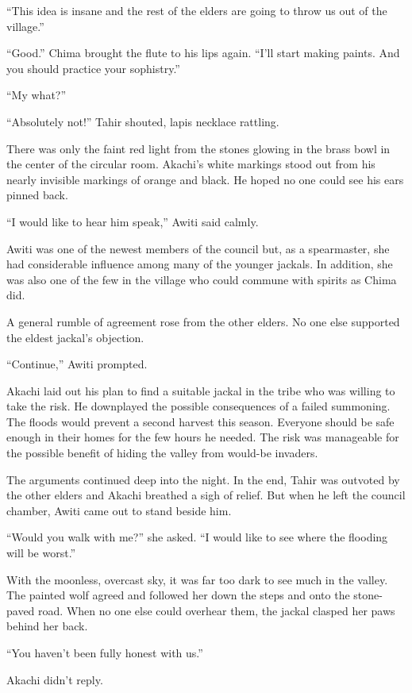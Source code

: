``This idea is insane and the rest of the elders are going to throw us out of the village.''

``Good.'' Chima brought the flute to his lips again. ``I'll start making paints. And you should practice your sophistry.''

``My what?''

\secdiv

\noindent ``Absolutely not!'' Tahir shouted, lapis necklace rattling.

There was only the faint red light from the stones glowing in the brass bowl in the center of the circular room. Akachi's white markings stood out from his nearly invisible markings of orange and black. He hoped no one could see his ears pinned back.

``I would like to hear him speak,'' Awiti said calmly.

Awiti was one of the newest members of the council but, as a spearmaster, she had considerable influence among many of the younger jackals. In addition, she was also one of the few in the village who could commune with spirits as Chima did.

A general rumble of agreement rose from the other elders. No one else supported the eldest jackal's objection.

``Continue,'' Awiti prompted. 

Akachi laid out his plan to find a suitable jackal in the tribe who was willing to take the risk. He downplayed the possible consequences of a failed summoning. The floods would prevent a second harvest this season. Everyone should be safe enough in their homes for the few hours he needed. The risk was manageable for the possible benefit of hiding the valley from would-be invaders.

The arguments continued deep into the night. In the end, Tahir was outvoted by the other elders and Akachi breathed a sigh of relief. But when he left the council chamber, Awiti came out to stand beside him. 

``Would you walk with me?'' she asked. ``I would like to see where the flooding will be worst.''

With the moonless, overcast sky, it was far too dark to see much in the valley. The painted wolf agreed and followed her down the steps and onto the stone-paved road. When no one else could overhear them, the jackal clasped her paws behind her back.

``You haven't been fully honest with us.''

Akachi didn't reply. 


